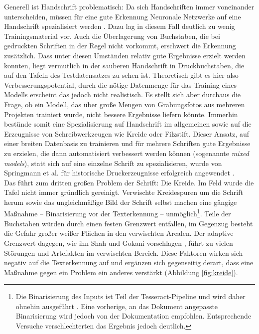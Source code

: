 Generell ist Handschrift problematisch: Da sich Handschriften immer voneinander unterscheiden, müssen für eine gute Erkennung Neuronale Netzwerke auf eine Handschrift spezialisiert werden \cite{sumedhahallale}. Dazu lag in diesem Fall deutlich zu wenig Trainingsmaterial vor. Auch die Überlagerung von Buchstaben, die bei gedruckten Schriften in der Regel nicht vorkommt, erschwert die Erkennung zusätzlich. Dass unter diesen Umständen relativ gute Ergebnisse erzielt werden konnten, liegt vermutlich in der sauberen Handschrift in Druckbuchstaben, die auf den Tafeln des Testdatensatzes zu sehen ist. Theoretisch gibt es hier also Verbesserungspotential, durch die nötige Datenmenge für das Training eines Modells erscheint das jedoch nicht realistisch. Es stellt sich aber durchaus die Frage, ob ein Modell, das über große Mengen von Grabungsfotos aus mehreren Projekten trainiert wurde, nicht bessere Ergebnisse liefern könnte. Immerhin bestünde somit eine Spezialisierung auf Handschrift im allgemeinen sowie auf die Erzeugnisse von Schreibwerkzeugen wie Kreide oder Filzstift. Dieser Ansatz, auf einer breiten Datenbasis zu trainieren und für mehrere Schriften gute Ergebnisse zu erzielen, die dann automatisiert verbessert werden können (sogenannte \textit{mixed models}), statt sich auf eine einzelne Schrift zu spezialisieren, wurde von Springmann et al. für historische Druckerzeugnisse erfolgreich angewendet \cite{springmann}.\\
Das führt zum dritten großen Problem der Schrift: Die Kreide. Im Feld wurde die Tafel nicht immer gründlich gereinigt. Verwischte Kreidespuren um die Schrift herum sowie das ungleichmäßige Bild der Schrift selbst machen eine gängige Maßnahme -- Binarisierung vor der Texterkennung \cite{hamad}{} \cite{sumedhahallale}{} -- unmöglich\footnote{Die Binarisierung des Inputs ist Teil der Tesseract-Pipeline und wird daher ohnehin ausgeführt \cite{forsberg}. Eine vorherige, an das Dokument angepasste Binarisierung wird jedoch von der Dokumentation empfohlen. Entsprechende Versuche verschlechterten das Ergebnis jedoch deutlich.}. Teile der Buchstaben würden durch einen festen Grenzwert entfallen, im Gegenzug besteht die Gefahr großer weißer Flächen in den verwischten Arealen. Der adaptive Grenzwert dagegen, wie ihn Shah und Gokani vorschlagen \cite{jenilshah}, führt zu vielen Störungen und Artefakten im verwischten Bereich. Diese Faktoren wirken sich negativ auf die Texterkennung auf und ergänzen sich gegenseitig derart, dass eine Maßnahme gegen ein Problem ein anderes verstärkt (Abbildung \ref{fig:kreide}).
